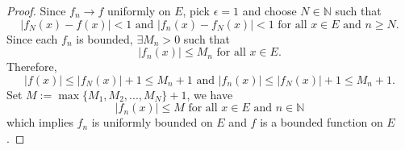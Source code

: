 \begin{Exercise}
\begin{proof}
Since $f_n\to f$ uniformly on $E$, pick $\epsilon = 1$ and choose $N\in\mathbb{N}$ such that $$ \left| f_N(x)-f(x) \right|<1\text{ and } \left| f_n(x)-f_N(x) \right|<1 \mbox{ for all } x\in E\text{ and } n\geq N.$$
Since each $f_n$ is bounded, $\exists M_n>0$ such that $$\left|f_n(x)\right|\leq M_n \mbox{ for all } x\in E.$$
Therefore, $$\left| f(x) \right| \leq \left| f_N(x) \right| +1\leq M_n+1\text{ and } \left|f_n(x)\right| \leq \left|f_N(x)\right|+1\leq M_n+1.$$
Set $M := \max\{M_1, M_2, ..., M_N\}+1$, we have $$\left| f_n(x) \right| \leq M\mbox{ for all } x\in E\text{ and } n\in\mathbb{N}$$
which implies ${f_n}$ is uniformly bounded on $E$ and $f$ is a bounded function on $E$.
\end{proof}
\end{Exercise}